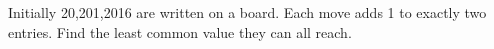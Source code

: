 Initially 20,201,2016 are written on a board. Each move adds 1 to exactly two entries. Find the least common value they can all reach.
